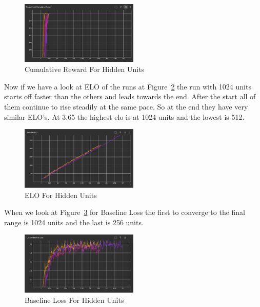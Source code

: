 \documentclass{LSkill}
\begin{document}
\begin{figure}[htbp]
    \centering
    \includegraphics[width=0.5\textwidth]{figure 7.png} 
    \caption{Cumulative Reward For Hidden Units}
    \label{fig:Cumulative Reward For Hidden Units}
\end{figure}

Now if we have a look at ELO of the runs at Figure~\ref{fig:ELO For Hidden Units} the run with 1024 units starts off faster than the others and leads towards the end. After the start all of them continue to rise steadily at the same pace. So at the end they have very similar ELO’s. At 3.65 the highest elo is at 1024 units and the lowest is 512.

\begin{figure}[htbp]
    \centering
    \includegraphics[width=0.5\textwidth]{figure 8.png} 
    \caption{ELO For Hidden Units}
    \label{fig:ELO For Hidden Units}
\end{figure}

When we look at Figure~\ref{fig:Baseline Loss For Hidden Units} for Baseline Loss the first to converge to the final range is 1024 units and the last is 256 units.

\vspace{0.5cm}
\begin{figure}[htbp]
    \centering
    \includegraphics[width=0.5\textwidth]{figure 9.png} 
    \caption{Baseline Loss For Hidden Units}
    \label{fig:Baseline Loss For Hidden Units}
\end{figure}
\end{document}
